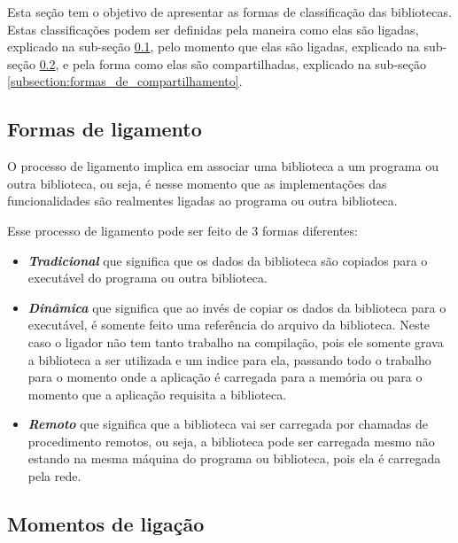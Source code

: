 Esta seção tem o objetivo de apresentar as formas de classificação das bibliotecas. Estas
classificações podem ser definidas pela maneira como elas são ligadas, explicado na sub-seção
\ref{subsection:formas_de_ligamento}, pelo momento que elas são ligadas, explicado na sub-seção
\ref{subsection:momentos_de_ligação}, e pela forma como elas são compartilhadas, explicado na
sub-seção \ref{subsection:formas_de_compartilhamento}.


\subsection{Formas de ligamento}
\label{subsection:formas_de_ligamento}

O processo de ligamento implica em associar uma biblioteca a um programa ou outra biblioteca, ou seja,
é nesse momento que as implementações das funcionalidades são realmentes ligadas ao programa ou
outra biblioteca.

Esse processo de ligamento pode ser feito de 3 formas diferentes:

\begin{itemize}

 \item \emph{\textbf{Tradicional}} que significa que os dados da biblioteca são copiados para o executável do programa
 ou outra biblioteca.

 \item \emph{\textbf{Dinâmica}} que significa que ao invés de copiar os dados da biblioteca para o executável, é
 somente feito uma referência do arquivo da biblioteca. Neste caso o ligador não tem tanto
 trabalho na compilação, pois ele somente grava a biblioteca a ser utilizada e um indice para
 ela, passando todo o trabalho para o momento onde a aplicação é carregada para a memória ou para
 o momento que a aplicação requisita a biblioteca.

 \item \emph{\textbf{Remoto}} que significa que a biblioteca vai ser carregada por chamadas de procedimento remotos,
 ou seja, a biblioteca pode ser carregada mesmo não estando na mesma máquina do programa ou
 biblioteca, pois ela é carregada pela rede.

\end{itemize}


\subsection{Momentos de ligação}
\label{subsection:momentos_de_ligação}

